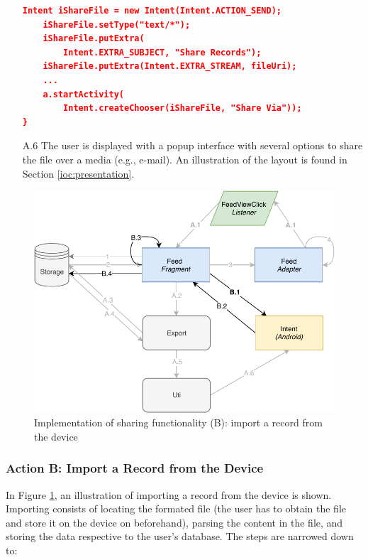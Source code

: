 \begin{itemize}
\begin{lstlisting}[language=json, caption={}, captionpos=b]
    Intent iShareFile = new Intent(Intent.ACTION_SEND);
    iShareFile.setType("text/*");
    iShareFile.putExtra(
        Intent.EXTRA_SUBJECT, "Share Records");
    iShareFile.putExtra(Intent.EXTRA_STREAM, fileUri);
    ...
    a.startActivity(
        Intent.createChooser(iShareFile, "Share Via"));
}

\end{lstlisting}

    \item[A.6] The user is displayed with a popup interface with several options to share the file over a media (e.g., e-mail). An illustration of the layout is found in Section \ref{ioc:presentation}. 


\end{itemize}


\begin{figure}
    \centering
    \includegraphics[scale=0.7]{images/Sharing_ImpB.pdf}
    \caption{Implementation of sharing functionality (B): import a record from the device}
    \label{fig:impl_sharingB}
\end{figure}

\subsubsection{Action B: Import a Record from the Device}
In Figure \ref{fig:impl_sharingB}, an illustration of importing a record from the device is shown. Importing consists of locating the formated file (the user has to obtain the file and store it on the device on beforehand), parsing the content in the file, and storing the data respective to the user's database. The steps are narrowed down to:

